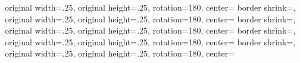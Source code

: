 {{	original width=.25\pgfpageoptionheight,%
	original height=.25\pgfpageoptionwidth,%
	rotation=180,%
	center=\pgfpoint{.25\pgfphysicalwidth}{.25\pgfphysicalheight}%
  }%
  {%
	border shrink=\pgfpageoptionborder,%
	original width=.25\pgfpageoptionheight,%
	original height=.25\pgfpageoptionwidth,%
	rotation=180,%
	center=\pgfpoint{1\pgfphysicalwidth}{0\pgfphysicalheight}%
  }%
  {%
	border shrink=\pgfpageoptionborder,%
	original width=.25\pgfpageoptionheight,%
	original height=.25\pgfpageoptionwidth,%
	rotation=180,%
	center=\pgfpoint{0.75\pgfphysicalwidth}{0\pgfphysicalheight}%
  }%
  {%
	border shrink=\pgfpageoptionborder,%
	original width=.25\pgfpageoptionheight,%
	original height=.25\pgfpageoptionwidth,%
	rotation=180,%
	center=\pgfpoint{0.5\pgfphysicalwidth}{0\pgfphysicalheight}%
  }%
  {%
	border shrink=\pgfpageoptionborder,%
	original width=.25\pgfpageoptionheight,%
	original height=.25\pgfpageoptionwidth,%
	rotation=180,%
	center=\pgfpoint{0.25\pgfphysicalwidth}{0\pgfphysicalheight}%
  }%
}%